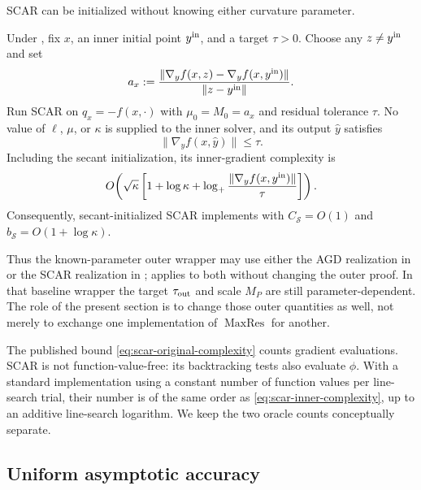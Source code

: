 \documentclass{article}
\begin{document}
SCAR can be initialized without knowing either curvature parameter.

\begin{corollary}
\label{cor:scar-inner}
Under , fix $x$, an inner initial point $y^{\rm in}$,
and a target $\tau>0$.  Choose any
$z\ne y^{\rm in}$ and set
\begin{equation}\label{eq:scar-secant}
 a_x:=\frac{
  \|\nabla_y f(x,z)-\nabla_y f(x,y^{\rm in})\|}
  {\|z-y^{\rm in}\|}.
\end{equation}
Run SCAR on $q_x=-f(x,\cdot)$ with
$\mu_0=M_0=a_x$ and residual tolerance $\tau$.  No value of $\ell$,
$\mu$, or $\kappa$ is supplied to the inner solver, and its output
$\widehat y$ satisfies
\[
 \|\nabla_y f(x,\widehat y)\|\le\tau.
\]
Including the secant initialization, its inner-gradient complexity is
\begin{equation}\label{eq:scar-inner-complexity}
 O\!\left(\sqrt\kappa\left[
  1+\log\kappa+
  \log_+\frac{\|\nabla_y f(x,y^{\rm in})\|}{\tau}
 \right]\right).
\end{equation}
Consequently, secant-initialized SCAR implements
 with
$C_{\mathcal S}=O(1)$ and
$b_{\mathcal S}=O(1+\log\kappa)$.
\end{corollary}




Thus the known-parameter outer wrapper
 may use either the AGD realization in
 or the SCAR realization in
;  applies to both
without changing the outer proof.  In that baseline wrapper the target
$\tau_{\rm out}$ and scale $M_P$ are still parameter-dependent.  The
role of the present section is to change those outer quantities as
well, not merely to exchange one implementation of
$\operatorname{MaxRes}$ for another.

The published bound \eqref{eq:scar-original-complexity} counts gradient
evaluations.  SCAR is not function-value-free: its backtracking tests
also evaluate $\phi$.  With a standard implementation using a constant
number of function values per line-search trial, their number is of the
same order as \eqref{eq:scar-inner-complexity}, up to an additive
line-search logarithm.  We keep the two oracle counts conceptually
separate.

\subsection{Uniform asymptotic accuracy}
\end{document}
